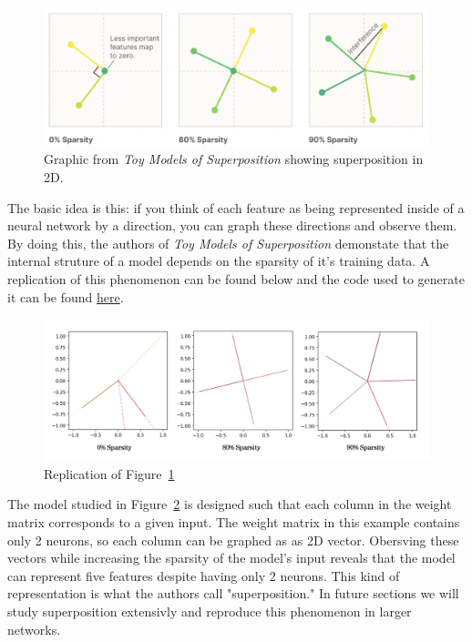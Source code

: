 \documentclass{article} %
\begin{document}
\begin{figure}[h]
    \centering
    \includegraphics[width=0.55\linewidth]{section_1/images/section1_anthropic_graphic_.png}
    \captionsetup{font=footnotesize} %
    \caption{
        Graphic from \textit{Toy Models of Superposition} showing superposition
        in 2D.
    }
    \label{fig:section1_anthropic}
\end{figure}

The basic idea is this: if you think of each feature as being represented inside of a
neural network by a direction, you can graph these directions and observe them.
By doing this, the authors of \textit{Toy Models of Superposition} demonstate that
the internal struture of a model depends on the sparsity of it's training data.
A replication of this phenomenon can be found below and the code used to 
generate it can be found 
\href{https://github.com/zroe1/toy_models_of_superposition/blob/main/section_1/section_1.ipynb}{here}.\\ 

\begin{figure}[h]
    \centering
    \includegraphics[width=0.6\linewidth]{section_1/images/section1_replicated_graphic.png}
    \captionsetup{font=footnotesize} %
    \caption{Replication of Figure~\ref{fig:section1_anthropic}}
    \label{fig:section1_replication}
\end{figure}

The model studied in  Figure~\ref{fig:section1_replication} is designed such that 
each column in the weight matrix corresponds to a  given input. The weight
matrix in this example contains only 2 neurons, so each column can be graphed as
as 2D vector. Obersving these vectors while increasing the sparsity of the model's input reveals
that the model can represent five features despite having only 2 neurons. This 
kind of representation is what the authors call "superposition." In future sections we will study 
superposition extensivly and reproduce this phenomenon in larger networks.
\end{document}
